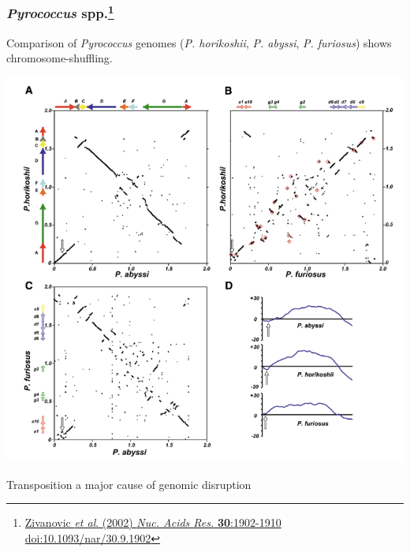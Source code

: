 \begin{frame}
  \frametitle{\textit{Pyrococcus} spp.\footnote{\tiny{\href{http://dx.doi.org/10.1093/nar/30.9.1902}{Zivanovic \textit{et al}. (2002) \textit{Nuc. Acids Res.} \textbf{30}:1902-1910 doi:10.1093/nar/30.9.1902}}}}
  Comparison of \textit{Pyrococcus} genomes (\textit{P. horikoshii}, \textit{P. abyssi}, \textit{P. furiosus}) shows chromosome-shuffling.\\
  \begin{center}
    \includegraphics[height=0.5\textheight]{images/pyrococcus}
  \end{center}    
  Transposition a major cause of genomic disruption    
\end{frame}


